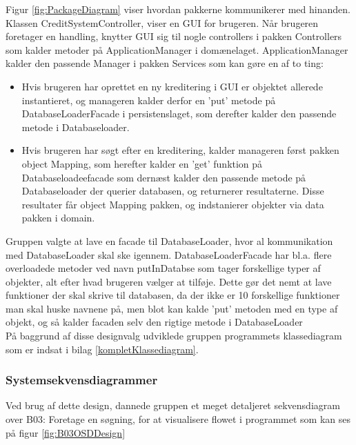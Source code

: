 Figur \ref{fig:PackageDiagram} viser hvordan pakkerne kommunikerer med hinanden.
Klassen CreditSystemController, viser en GUI for brugeren. Når brugeren
foretager en handling, knytter GUI sig til nogle controllers i pakken
Controllers som kalder metoder på ApplicationManager i domænelaget.
ApplicationManager kalder den passende Manager i pakken Services som kan gøre en
af to ting: 

\begin{itemize}
    \item Hvis brugeren har oprettet en ny kreditering i GUI er objektet
        allerede instantieret, og manageren kalder derfor en 'put' metode på
        DatabaseLoaderFacade i persistenslaget, som derefter kalder den passende
        metode i Databaseloader. 
    \item Hvis brugeren har søgt efter en kreditering, kalder manageren først
        pakken object Mapping, som herefter kalder en 'get' funktion på
        Databaseloadeefacade som dernæst kalder den passende metode på
        Databaseloader der querier databasen, og returnerer resultaterne. Disse
        resultater får object Mapping pakken, og indstanierer objekter via data
        pakken i domain.
\end{itemize}

Gruppen valgte at lave en facade til DatabaseLoader, hvor al kommunikation med DatabaseLoader skal ske igennem. DatabaseLoaderFacade har bl.a. flere overloadede metoder ved navn putInDatabse som tager forskellige typer af objekter, alt efter hvad brugeren vælger at tilføje. Dette gør det nemt at lave funktioner der skal skrive til databasen, da der ikke er 10 forskellige funktioner man skal huske navnene på, men blot kan kalde 'put' metoden med en type af objekt, og så kalder facaden selv den rigtige metode i DatabaseLoader
\\
På baggrund af disse designvalg udviklede gruppen programmets klassediagram som er indsat i bilag \ref{kompletKlassediagram}. 

\subsubsection{Systemsekvensdiagrammer}%
\label{ssub:systemsekvensdiagrammer}
Ved brug af dette design, dannede gruppen et meget detaljeret sekvensdiagram over B03: Foretage en søgning, for at visualisere flowet i programmet som kan ses på figur \ref{fig:B03OSDDesign}

